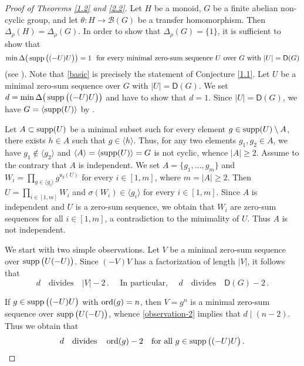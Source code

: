 \documentclass[a4paper,10pt]{amsart}
\theoremstyle{plain}
\theoremstyle{definition}
\numberwithin{equation}{section}
\begin{document}
\begin{proof}[Proof of Theorems \ref{1.2} and \ref{2.2}]
Let $H$  be a monoid, $G$ be a finite abelian non-cyclic group, and let $\theta \colon H \to \mathcal B (G)$ be a transfer homomorphism. Then $\Delta_{\rho} (H) = \Delta_{\rho} (G)$. In order to show that $\Delta_{\rho} (G) = \{1\}$, it is sufficient to show that
\begin{equation} \label{basic}
\min\Delta \big(\operatorname{supp} \big((-U)U \big) \big)=1 \ \text{ for every minimal zero-sum sequence $U$ over $G$ with $|U|=\mathsf D(G)$}
\end{equation}
(see \cite[Corollary 3.3.2]{Ge-Zh18a}). Note that \eqref{basic} is precisely the statement of Conjecture \ref{1.1}. Let $U$ be a minimal zero-sum sequence over $G$ with $|U|= \mathsf D (G)$. We set $d = \min\Delta \big(\operatorname{supp} \big((-U)U \big) \big)$ and have to show that $d=1$. Since $|U| = \mathsf D (G)$, we have $G = \langle \operatorname{supp} (U) \rangle$ by \cite[Proposition 5.1.4]{Ge-HK06a}.

Let $A\subset \operatorname{supp}(U)$ be a minimal subset such for every element $g\in \operatorname{supp}(U)\setminus A$, there exists $h\in A$ such that $g\in \langle h\rangle$.
Thus, for any two elements $g_1,g_2\in A$, we have $g_1\not\in \langle g_2\rangle$ and $\langle A\rangle = \langle \operatorname{supp} (U) \rangle =G$ is not cyclic, whence $|A|\ge 2$.  Assume to the contrary that $A$ is independent. We set  $A=\{g_1, \ldots, g_m \}$ and $W_i=\prod_{g\in \langle g_i\rangle }g^{\mathsf v_g(U)}$ for every $i\in [1,m]$, where $m = |A| \ge 2$. Then $U=\prod_{i\in [1,m]}W_i$ and $\sigma(W_i)\in \langle g_i\rangle$ for every $i\in [1,m]$. Since $A$ is independent and $U$ is a zero-sum sequence, we obtain that $W_i$ are zero-sum sequences for all $i\in [1,m]$, a contradiction to the minimality of $U$. Thus $A$ is not independent.


We start with two simple observations. Let $V$ be a minimal zero-sum sequence over $\operatorname{supp} \big(U(-U) \big)$.
Since $(-V)V$ has a factorization of length $|V|$, it follows that
\begin{equation} \label{observation-2}
d \quad  \text{divides} \quad  |V| -2  \,. \quad \text{ In particular, }\quad  d \quad  \text{divides} \quad \mathsf  D(G) -2 \,.
\end{equation}


If $g \in \operatorname{supp} \big( (-U)U \big)$ with $\operatorname{ord} (g)=n$, then $V=g^n$ is a minimal zero-sum sequence over $\operatorname{supp} \big(U(-U) \big)$, whence \eqref{observation-2} implies that $d \mid (n-2)$. Thus we obtain that
\begin{equation} \label{observation-1}
d \quad  \text{divides} \quad \operatorname{ord} (g)-2 \quad \text{for all $g \in \operatorname{supp} \big( (-U)U \big)$} \,.
\end{equation}





\end{proof}
\end{document}
